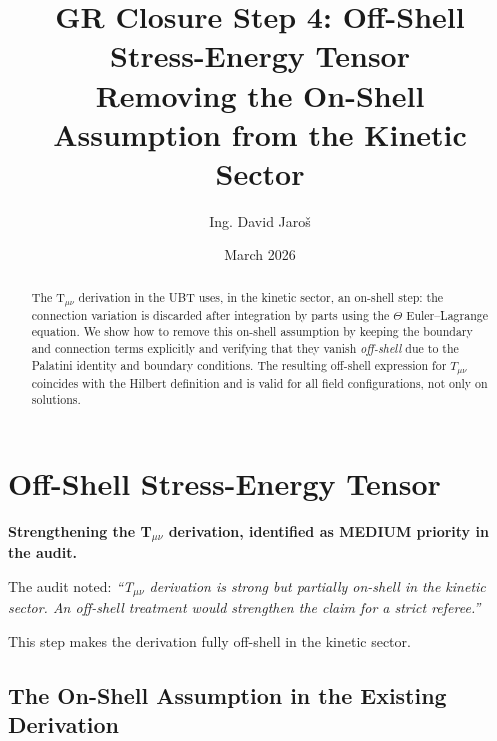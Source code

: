 \documentclass[12pt]{article}
\title{\textbf{GR Closure Step 4: Off-Shell Stress-Energy Tensor\\
         Removing the On-Shell Assumption from the Kinetic Sector}}
\author{Ing. David Jaroš}
\date{March 2026}
\theoremstyle{definition}
\theoremstyle{remark}
\begin{document}
  \maketitle

  \begin{abstract}
  The T$_{\mu\nu}$ derivation in the UBT uses, in the kinetic sector, an
  on-shell step: the connection variation is discarded after integration by parts
  using the $\Theta$ Euler--Lagrange equation.  We show how to remove this on-shell
  assumption by keeping the boundary and connection terms explicitly and verifying
  that they vanish \emph{off-shell} due to the Palatini identity and boundary conditions.
  The resulting off-shell expression for $T_{\mu\nu}$ coincides with the Hilbert
  definition and is valid for all field configurations, not only on solutions.
  \end{abstract}
\fi

\section{Off-Shell Stress-Energy Tensor}
\label{sec:offshell_Tmunu}

\begin{tcolorbox}[colback=blue!5!white,colframe=blue!75!black,title=Purpose of This Step]
\textbf{Strengthening the T$_{\mu\nu}$ derivation, identified as MEDIUM priority in the audit.}

The audit noted: \emph{``T$_{\mu\nu}$ derivation is strong but partially on-shell
in the kinetic sector. An off-shell treatment would strengthen the claim for a strict referee.''}

This step makes the derivation fully off-shell in the kinetic sector.
\end{tcolorbox}

\subsection{The On-Shell Assumption in the Existing Derivation}
\end{document}
